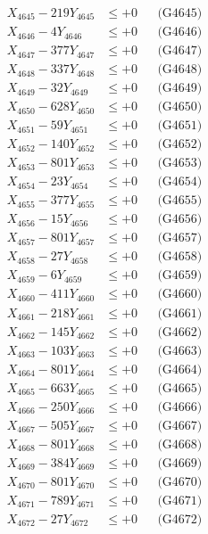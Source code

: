 \documentclass[a4paper,10pt]{article}
\begin{document}
{\begin{align}
X_{4645} - 219Y_{4645} &\leq +0 && \text{(G4645)} \\
X_{4646} - 4Y_{4646} &\leq +0 && \text{(G4646)} \\
X_{4647} - 377Y_{4647} &\leq +0 && \text{(G4647)} \\
X_{4648} - 337Y_{4648} &\leq +0 && \text{(G4648)} \\
X_{4649} - 32Y_{4649} &\leq +0 && \text{(G4649)} \\
X_{4650} - 628Y_{4650} &\leq +0 && \text{(G4650)} \\
\allowbreak
X_{4651} - 59Y_{4651} &\leq +0 && \text{(G4651)} \\
X_{4652} - 140Y_{4652} &\leq +0 && \text{(G4652)} \\
X_{4653} - 801Y_{4653} &\leq +0 && \text{(G4653)} \\
X_{4654} - 23Y_{4654} &\leq +0 && \text{(G4654)} \\
X_{4655} - 377Y_{4655} &\leq +0 && \text{(G4655)} \\
X_{4656} - 15Y_{4656} &\leq +0 && \text{(G4656)} \\
X_{4657} - 801Y_{4657} &\leq +0 && \text{(G4657)} \\
X_{4658} - 27Y_{4658} &\leq +0 && \text{(G4658)} \\
X_{4659} - 6Y_{4659} &\leq +0 && \text{(G4659)} \\
X_{4660} - 411Y_{4660} &\leq +0 && \text{(G4660)} \\
\allowbreak
X_{4661} - 218Y_{4661} &\leq +0 && \text{(G4661)} \\
X_{4662} - 145Y_{4662} &\leq +0 && \text{(G4662)} \\
X_{4663} - 103Y_{4663} &\leq +0 && \text{(G4663)} \\
X_{4664} - 801Y_{4664} &\leq +0 && \text{(G4664)} \\
X_{4665} - 663Y_{4665} &\leq +0 && \text{(G4665)} \\
X_{4666} - 250Y_{4666} &\leq +0 && \text{(G4666)} \\
X_{4667} - 505Y_{4667} &\leq +0 && \text{(G4667)} \\
X_{4668} - 801Y_{4668} &\leq +0 && \text{(G4668)} \\
X_{4669} - 384Y_{4669} &\leq +0 && \text{(G4669)} \\
X_{4670} - 801Y_{4670} &\leq +0 && \text{(G4670)} \\
\allowbreak
X_{4671} - 789Y_{4671} &\leq +0 && \text{(G4671)} \\
X_{4672} - 27Y_{4672} &\leq +0 && \text{(G4672)} \\

\end{align}}
\end{document}

